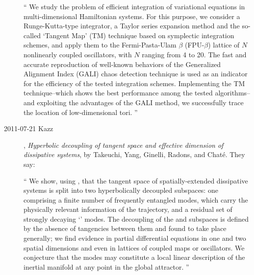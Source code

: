 \begin{description}
``
We study the problem of efficient integration of variational equations in
multi-dimensional Hamiltonian systems. For this purpose, we consider a
Runge-Kutta-type integrator, a Taylor series expansion method and the
so-called `Tangent Map' (TM) technique based on symplectic integration
schemes, and apply them to the Fermi-Pasta-Ulam $\beta$ (FPU-$\beta$)
lattice of $N$ nonlinearly coupled oscillators, with $N$ ranging from 4
to 20. The fast and accurate reproduction of well-known behaviors of the
Generalized Alignment Index (GALI) chaos detection technique is used as
an indicator for the efficiency of the tested integration schemes.
Implementing the TM technique--which shows the best performance among the
tested algorithms--and exploiting the advantages of the GALI method, we
successfully trace the location of low-dimensional tori.
''

\item[2011-07-21 Kazz] ,
\emph{Hyperbolic decoupling of tangent space
      and effective dimension of dissipative systems},
by Takeuchi, Yang, Ginelli, Radons, and Chat\'e.
They say:

``
We show, using {\cLvs}, that the tangent space of
spatially-extended dissipative systems is split into two hyperbolically
decoupled subspaces: one comprising a finite number of frequently
entangled {\entangled} modes, which carry the physically relevant
information of the trajectory, and a residual set of strongly decaying
`{\transient}' modes. The decoupling of the {\entangled} and {\transient} subspaces
is defined by the absence of tangencies between them and found to take
place generally; we find evidence in partial differential equations in
one and two spatial dimensions and even in lattices of coupled maps or
oscillators. We conjecture that the {\entangled} modes may constitute a local
linear description of the inertial manifold at any point in the global
attractor.
''


\end{description}
